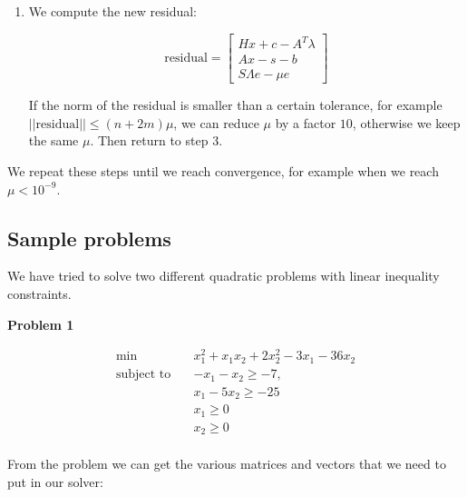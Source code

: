 \documentclass{article}
\begin{document}
\begin{enumerate}
\item We compute the new residual:

\begin{equation*}
\text{residual}=
\begin{bmatrix}
H x + c - A^T \lambda \\
A x - s - b \\
S \Lambda e -\mu e
\end{bmatrix} 
\end{equation*}

If the norm of the residual is smaller than a certain tolerance, for example $||\text{residual}||\le (n+2m) \mu$, we can reduce $\mu$ by a factor $10$, otherwise we keep the same $\mu$. Then return to step $3$.


\end{enumerate}

We repeat these steps until we reach convergence, for example when we reach $\mu<10^{-9}$.

\subsection{Sample problems}

We have tried to solve two different quadratic problems with linear inequality constraints.

\newpage

\textbf{Problem 1}

\begin{equation*} 
\begin{aligned}
\textrm{min} \quad        & x_1^2+x_1 x_2+2x_2^2-3x_1-36x_2 \\
\textrm{subject to} \quad & -x_1-x_2\geq -7,  \\
                          & x_1-5x_2\ge -25\\
                          & x_1 \ge 0\\
                          & x_2 \ge 0\\
\end{aligned}
\end{equation*}

From the problem we can get the various matrices and vectors that we need to put in our solver:
\end{document}
